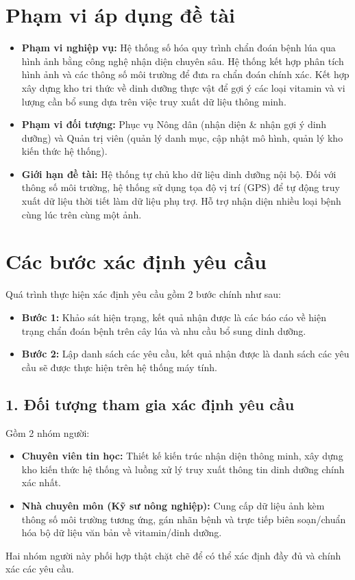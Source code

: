 ﻿\documentclass[12pt,a4paper]{article}
\begin{document}
\hrulefill

\section*{Phạm vi áp dụng đề tài}
\begin{itemize}
    \item \textbf{Phạm vi nghiệp vụ:} Hệ thống số hóa quy trình chẩn đoán bệnh lúa qua hình ảnh bằng công nghệ nhận diện chuyên sâu. Hệ thống kết hợp phân tích hình ảnh và các thông số môi trường để đưa ra chẩn đoán chính xác. Kết hợp xây dựng kho tri thức về dinh dưỡng thực vật để gợi ý các loại vitamin và vi lượng cần bổ sung dựa trên việc truy xuất dữ liệu thông minh.
    \item \textbf{Phạm vi đối tượng:} Phục vụ Nông dân (nhận diện \& nhận gợi ý dinh dưỡng) và Quản trị viên (quản lý danh mục, cập nhật mô hình, quản lý kho kiến thức hệ thống).
    \item \textbf{Giới hạn đề tài:} Hệ thống tự chủ kho dữ liệu dinh dưỡng nội bộ. Đối với thông số môi trường, hệ thống sử dụng tọa độ vị trí (GPS) để tự động truy xuất dữ liệu thời tiết làm dữ liệu phụ trợ. Hỗ trợ nhận diện nhiều loại bệnh cùng lúc trên cùng một ảnh.
\end{itemize}

\section*{Các bước xác định yêu cầu}

Quá trình thực hiện xác định yêu cầu gồm 2 bước chính như sau:
\begin{itemize}
    \item \textbf{Bước 1:} Khảo sát hiện trạng, kết quả nhận được là các báo cáo về hiện trạng chẩn đoán bệnh trên cây lúa và nhu cầu bổ sung dinh dưỡng.
    \item \textbf{Bước 2:} Lập danh sách các yêu cầu, kết quả nhận được là danh sách các yêu cầu sẽ được thực hiện trên hệ thống máy tính.
\end{itemize}

\subsection*{1. Đối tượng tham gia xác định yêu cầu}
Gồm 2 nhóm người:
\begin{itemize}
    \item \textbf{Chuyên viên tin học:} Thiết kế kiến trúc nhận diện thông minh, xây dựng kho kiến thức hệ thống và luồng xử lý truy xuất thông tin dinh dưỡng chính xác nhất.
    \item \textbf{Nhà chuyên môn (Kỹ sư nông nghiệp):} Cung cấp dữ liệu ảnh kèm thông số môi trường tương ứng, gán nhãn bệnh và trực tiếp biên soạn/chuẩn hóa bộ dữ liệu văn bản về vitamin/dinh dưỡng.
\end{itemize}
Hai nhóm người này phối hợp thật chặt chẽ để có thể xác định đầy đủ và chính xác các yêu cầu.
\end{document}
